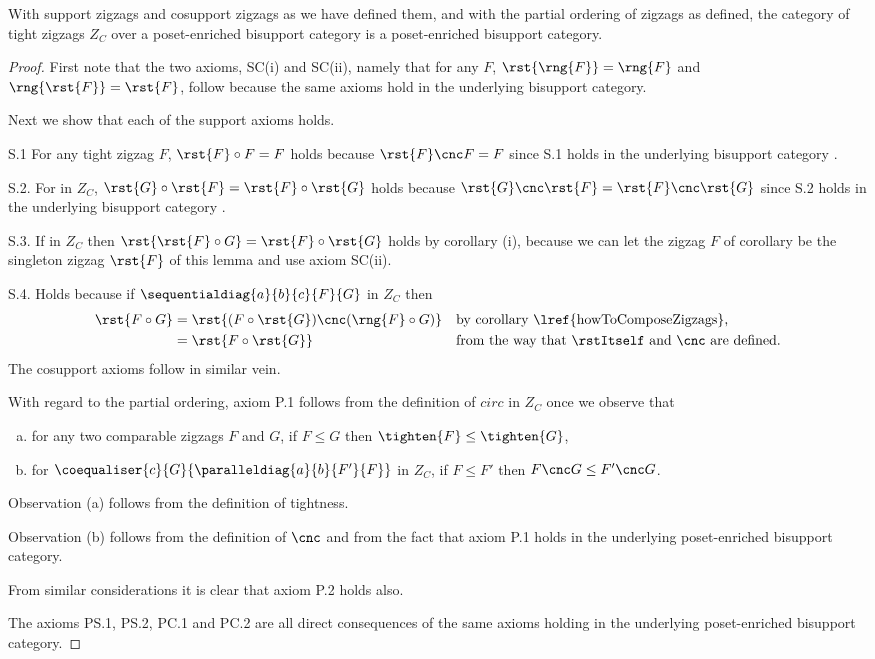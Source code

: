 \begin{lemma}
With support zigzags and cosupport zigzags as we have defined them, and with the partial ordering of zigzags as defined,
the category of tight zigzags $Z_C$ 
over a poset-enriched bisupport category
is a poset-enriched bisupport category.
\end{lemma}
\begin{proof}
First note that the two axioms, SC(i) and SC(ii),
namely that for any $F$, 
$\rst{\rng{F}} = \rng{F}$ and $\rng{\rst{F}} = \rst{F}$, 
follow because the same axioms hold 
in the underlying bisupport category.

Next we show that each of the support axioms holds.

S.1 For any tight 
zigzag $F$, 
$\rst{F} \circ F = F$ holds 
 because $\rst{F} \cnc F = F$
  since S.1 holds 
 in the underlying bisupport category \catc.

S.2. For \FGsourcediag in $Z_C$,
$\rst{G} \circ \rst{F}=\rst{F} \circ \rst{G}$ holds
because $\rst{G} \cnc \rst{F}=\rst{F} \cnc \rst{G}$
 since S.2 holds in the underlying bisupport category \catc.

S.3. If \FGsourcediag in $Z_C$ then
$\rst{\rst{F} \circ G} = \rst{F} \circ \rst{G}$
holds by corollary  (i), because  
we can let the zigzag $F$ of corollary 
be the singleton zigzag $\rst{F}$ of this lemma and use axiom SC(ii).

S.4. Holds because if $\sequentialdiag{a}{b}{c}{F}{G}$ in $Z_C$ then
\begin{align*}
\rst{F \circ G} 
         &= \rst{(F \circ \rst{G}) \cnc (\rng{F} \circ G)}
                && \mbox{by corollary \lref{howToComposeZigzags},} \\
         &= \rst{F \circ \rst{G}} 
                &&\mbox{from the way that \rstItself and $\cnc$ are defined.}
\end{align*}
The cosupport axioms follow in similar vein. 

With regard to the partial ordering, axiom P.1 follows from the definition of $circ$ 
in $Z_C$ once we observe that 
\begin{enumerate}[(a)]
\item for any two comparable zigzags $F$ and $G$,
if $F \leq G$ then $\tighten{F} \leq \tighten{G}$,
\item for $\coequaliser{c}{G}{\paralleldiag{a}{b}{F'}{F}}$
in $Z_C$, if $F \leq F'$ then $F \cnc G \leq F' \cnc G$.
\end{enumerate}
Observation (a) follows from the definition of tightness.

Observation (b) follows from the definition of $\cnc$ and from the fact that axiom P.1 holds 
in the underlying poset-enriched bisupport category.

From similar considerations it is clear that axiom P.2 holds also.

The axioms PS.1, PS.2, PC.1 and PC.2 
are all direct consequences of the same axioms
holding in the underlying poset-enriched bisupport category.
\end{proof}

